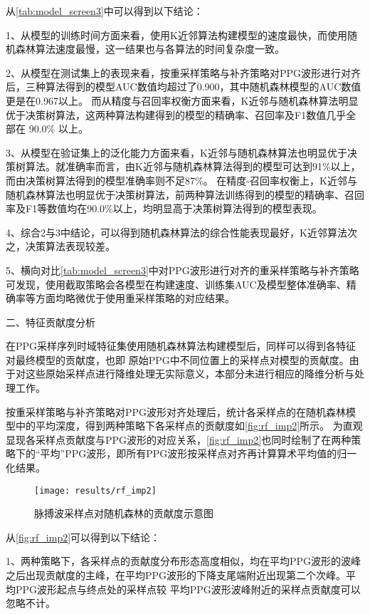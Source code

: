 从\autoref{tab:model_screen3}中可以得到以下结论：

1、从模型的训练时间方面来看，使用K近邻算法构建模型的速度最快，而使用随机森林算法速度最慢，这一结果也与各算法的时间复杂度一致。

2、从模型在测试集上的表现来看，按重采样策略与补齐策略对PPG波形进行对齐后，三种算法得到的模型AUC数值均超过了0.900，其中随机森林模型的AUC数值更是在0.967以上。
而从精度与召回率权衡方面来看，K近邻与随机森林算法明显优于决策树算法，这两种算法构建得到的模型的精确率、召回率及F1数值几乎全部在 90.0\% 以上。

3、从模型在验证集上的泛化能力方面来看，K近邻与随机森林算法也明显优于决策树算法。就准确率而言，由K近邻与随机森林算法得到的模型可达到91\%以上，而由决策树算法得到的模型准确率则不足87\%。
在精度-召回率权衡上，K近邻与随机森林算法也明显优于决策树算法，前两种算法训练得到的模型的精确率、召回率及F1等数值均在90.0\%以上，均明显高于决策树算法得到的模型表现。

4、综合2与3中结论，可以得到随机森林算法的综合性能表现最好，K近邻算法次之，决策算法表现较差。

5、横向对比\autoref{tab:model_screen3}中对PPG波形进行对齐的重采样策略与补齐策略可发现，使用截取策略会各模型在构建速度、训练集AUC及模型整体准确率、精确率等方面均略微优于使用重采样策略的对应结果。

二、特征贡献度分析

在PPG采样序列时域特征集使用随机森林算法构建模型后，同样可以得到各特征对最终模型的贡献度，也即
原始PPG中不同位置上的采样点对模型的贡献度。由于对这些原始采样点进行降维处理无实际意义，本部分未进行相应的降维分析与处理工作。

按重采样策略与补齐策略对PPG波形对齐处理后，统计各采样点的在随机森林模型中的平均深度，得到两种策略下各采样点的贡献度如\autoref{fig:rf_imp2}所示。
为直观显现各采样点贡献度与PPG波形的对应关系，\autoref{fig:rf_imp2}也同时绘制了在两种策略下的“平均”PPG波形，即所有PPG波形按采样点对齐再计算算术平均值的归一化结果。

\begin{figure}[htbp]
    \centering
    \texttt{[image: results/rf\_imp2]}
    \caption{\label{fig:rf_imp2}脉搏波采样点对随机森林的贡献度示意图}
\end{figure}

从\autoref{fig:rf_imp2}可以得到以下结论：

1、两种策略下，各采样点的贡献度分布形态高度相似，均在平均PPG波形的波峰之后出现贡献度的主峰，在平均PPG波形的下降支尾端附近出现第二个次峰。平均PPG波形起点与终点处的采样点较
平均PPG波形波峰附近的采样点贡献度可以忽略不计。

